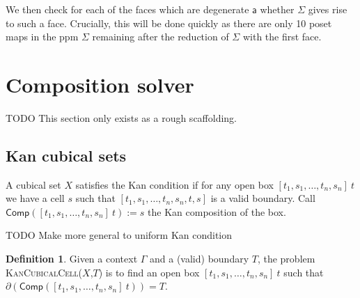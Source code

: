 \documentclass[11pt]{article}
\theoremstyle{definition}
\newtheorem{definition}{Definition}
\newcommand{\continuation}{??}
\newenvironment{examplecontd}[1]
{\renewcommand{\continuation}{\ref{#1}}\expcont[continued]}
{\endexpcont}
\newcommand{\todo}[1]{
  \begin{tcolorbox}
    TODO {#1} 
  \end{tcolorbox}
}
\newcommand{\mdef}{:=}
\newcommand{\problem}[1]{\textsc{{#1}}}
\newcommand{\pint}[1]{\mathbf{1}^{#1}}
\newcommand{\cset}[1]{\ensuremath{\mathsf{{#1}}}}
\newcommand{\boundary}[1]{\partial({#1})}
\newcommand{\comp}[2]{\mathsf{Comp}({#1}\ {#2})}
\begin{document}
\begin{examplecontd}{exp:sndsphere}
\begin{center}
\end{center}

We then check for each of the faces which are degenerate \cset{a} whether
$\Sigma$ gives rise to such a face. Crucially, this will be done quickly as
there are only 10 poset maps in the ppm $\Sigma$ remaining after the reduction
of $\Sigma$ with the first face.

\end{examplecontd}









\section{Composition solver}
\label{sec:compositionsolver}

\todo{This section only exists as a rough scaffolding.}

\subsection{Kan cubical sets}

A cubical set $X$ satisfies the Kan condition if for any open box
$[t_1, s_1, \ldots , t_n , s_n] \ t$ we have a cell $s$ such that $[t_1,
s_1, \ldots , t_n , s_n , t, s]$ is a valid boundary. Call $\comp{[t_1, s_1,
  \ldots , t_n , s_n]}{t} \mdef s$ the Kan composition of the box. 

\todo{Make more general to uniform Kan condition}

\begin{definition}
  Given a context $\Gamma$ and a (valid) boundary $T$, the problem
  \problem{KanCubicalCell}($X$,$T$) is to find an open box $[t_1, s_1, \ldots ,
  t_n , s_n] \ t$ such that $\boundary{\comp{[t_1, s_1, \ldots , t_n , s_n]}{t}} = T$.
\end{definition}
\end{document}
